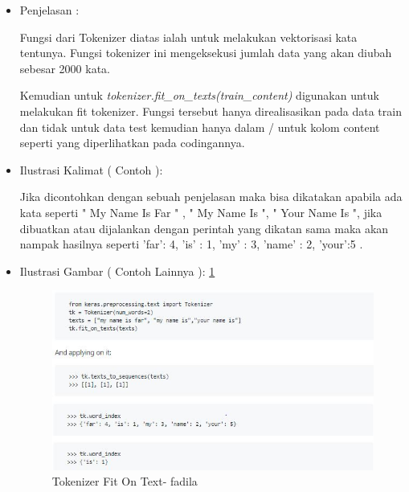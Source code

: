 \begin{enumerate}
\begin{itemize}
\item Penjelasan	:
\par  Fungsi dari Tokenizer diatas ialah untuk melakukan vektorisasi kata tentunya. Fungsi tokenizer ini mengeksekusi jumlah data yang akan diubah sebesar 2000 kata. 
\par Kemudian untuk  \emph{tokenizer.fit\_on\_texts(train\_content)} digunakan untuk melakukan fit tokenizer. Fungsi tersebut hanya direalisasikan pada data train dan tidak untuk data test kemudian hanya dalam / untuk kolom content seperti yang diperlihatkan pada codingannya.
\item Ilustrasi Kalimat ( Contoh ):
\par Jika dicontohkan dengan sebuah penjelasan maka bisa dikatakan apabila ada kata seperti " My Name Is Far " , " My Name Is ", " Your Name Is ", jika dibuatkan atau dijalankan dengan perintah yang dikatan sama maka akan nampak hasilnya seperti { 'far': 4, 'is' : 1, 'my' : 3, 'name' : 2, 'your':5 } .
\par
\par
\par
\item Ilustrasi Gambar ( Contoh Lainnya ): \ref{chapter-7-tokenizer-sum-words-fadila}
\par
\par
\begin{figure}[!hbtp]
\centering
\includegraphics[scale=0.2]{figures/chapter-7-tokenizer-sum-words-fadila.jpg}
\caption{Tokenizer Fit On Text- fadila}
\label{chapter-7-tokenizer-sum-words-fadila}
\end{figure}
\par
\par
\end{itemize}
\par
\par
\par

\end{enumerate}
